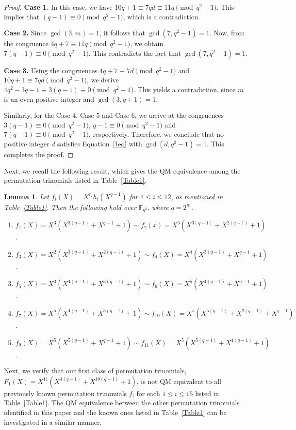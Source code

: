 \documentclass[12pt,reqno]{amsart}
\newtheorem{lem}[thm]{Lemma}
\numberwithin{equation}{section}
\theoremstyle{definition}
\newcommand{\F}{\mathbb F}
\begin{document}
\begin{proof}
\textbf{Case 1.} In this case, we have $10q+1\equiv 7qd\equiv 11q\pmod{q^2-1}$. This implies that $(q-1) \equiv 0 \pmod{q^2-1}$, which is a contradiction.

\textbf{Case 2.} Since $\gcd(3,m)=1$, it follows that $\gcd(7,q^2-1)=1$. Now, from the congruence $4q+7\equiv 11q\pmod{q^2-1}$, we obtain $ 7(q-1)\equiv0\pmod{q^2-1}. $ This contradicts the fact that $\gcd(7,q^2-1)=1$.

\textbf{Case 3.} Using the congruences $4q+7\equiv7d\pmod{q^2-1}$ and $10q+1\equiv7qd\pmod{q^2-1}$, we derive $4q^2-3q-1\equiv3(q-1)\equiv0\pmod{q^2-1}.$
This yields a contradiction, since $m$ is an even positive integer and $\gcd(3, q+1)  = 1$.  

Similarly, for the Case 4, Case 5 and Case 6, we arrive at the congruences $3(q-1)\equiv 0 \pmod{q^2-1}$, $q-1\equiv 0 \pmod{q^2-1}$ and $7(q-1)\equiv 0 \pmod{q^2-1}$, respectively. Therefore, we conclude that no positive integer $d$ satisfies Equation~\eqref{1eq} with $\gcd(d,q^2-1)=1$. This completes the proof.
\end{proof}
Next, we recall the following result, which gives the QM equivalence among the permutation trinomials listed in Table~\ref{Table1}.
\begin{lem}{\label{equi}}\cite[Theorem 4.1]{Harsh}
Let $f_i(X)=X^{r_i} h_i\left(X^{q-1}\right)$ for $1 \leq i \leq 12$, as mentioned in Table~\ref{Table1}. Then the following hold over $\F_{q^2}$, where $q=2^m$.
\begin{enumerate}
\item $f_1(X)=X^3\left(X^{3(q-1)}+X^{q-1}+1\right) \sim f_2(x)=X^3\left(X^{3(q-1)}+X^{2(q-1)}+1\right)$.
\item $f_3(X)=X^2\left(X^{3(q-1)}+X^{2(q-1)}+1\right) \sim f_4(X)=X^4\left(X^{3(q-1)}+X^{q-1}+1\right)$.
\item $f_5(X)=X^3\left(X^{4(q-1)}+X^{3(q-1)}+1\right) \sim f_6(X)=X^5\left(X^{4(q-1)}+X^{q-1}+1\right)$.
\item $f_7(X)=X^5\left(X^{4(q-1)}+X^{3(q-1)}+1\right) \sim f_{10}(X)=X^5\left(X^{5(q-1)}+X^{2(q-1)}+X^{q-1}\right)$.
\item $f_9(X)=X^5\left(X^{5(q-1)}+X^{q-1}+1\right) \sim f_{11}(X)=X^5\left(X^{5(q-1)}+X^{4(q-1)}+1\right)$.
\end{enumerate}
\end{lem}

Next, we verify that our first class of permutation trinomials, $F_{1}(X) = X^{11}(X^{4(q-1)}+X^{10(q-1)}+1)$, is not QM equivalent to all previously known permutation trinomials $f_i$ for each $1\leq i \leq 15$ listed in Table~\ref{Table1}. The QM equivalence between the other permutation trinomials identified in this paper and the known ones listed in Table~\ref{Table1} can be investigated in a similar manner. 
\end{document}
